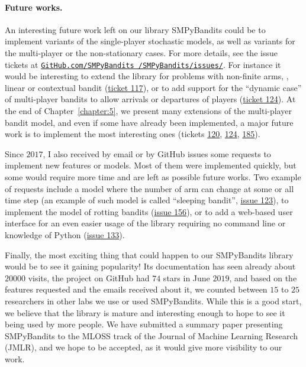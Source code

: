 \paragraph{Future works.}
%
An interesting future work left on our library SMPyBandits could be to implement variants of the single-player stochastic models, as well as variants for the multi-player or the non-stationary cases.
For more details, see the issue tickets at \href{https://github.com/SMPyBandits/SMPyBandits/issues/}{\texttt{GitHub.com/SMPyBandits /SMPyBandits/issues/}}.
For instance it would be interesting to extend the library for problems with non-finite arms, \eg, linear or contextual bandit (\href{https://github.com/SMPyBandits/SMPyBandits/issues/117}{ticket 117}),
or to add support for the ``dynamic case'' of multi-player bandits to allow arrivals or departures of players (\href{https://github.com/SMPyBandits/SMPyBandits/issues/124}{ticket 124}).
%
At the end of Chapter~\ref{chapter:5}, we present many extensions of the multi-player bandit model,
and even if some have already been implemented, a major future work is to implement the most interesting ones
(tickets \href{https://github.com/SMPyBandits/SMPyBandits/issues/120}{120}, \href{https://github.com/SMPyBandits/SMPyBandits/issues/124}{124}, \href{https://github.com/SMPyBandits/SMPyBandits/issues/185}{185}).

Since $2017$, I also received by email or by GitHub issues some requests to implement new features or models. Most of them were implemented quickly, but some would require more time and are left as possible future works.
Two example of requests include a model where the number of arm can change at some or all time step (an example of such model is called ``sleeping bandit'', \href{https://github.com/SMPyBandits/SMPyBandits/issues/123}{issue 123}), to implement the model of rotting bandits (\href{https://github.com/SMPyBandits/SMPyBandits/issues/156}{issue 156}), or to add a web-based user interface for an even easier usage of the library requiring no command line or knowledge of Python (\href{https://github.com/SMPyBandits/SMPyBandits/issues/133}{issue 133}).


Finally, the most exciting thing that could happen to our SMPyBandits library would be to see it gaining popularity!
Its documentation has seen already about $20000$ visits, the project on GitHub had $74$ stars in June $2019$, and based on the features requested and the emails received about it, we counted between $15$ to $25$ researchers in other labs we use or used SMPyBandits.
While this is a good start, we believe that the library is mature and interesting enough to hope to see it being used by more people.
%
We have submitted a summary paper presenting SMPyBandits \cite{SMPyBanditsJMLR} to the MLOSS track of the Journal of Machine Learning Research (JMLR), and we hope to be accepted, as it would give more visibility to our work.

